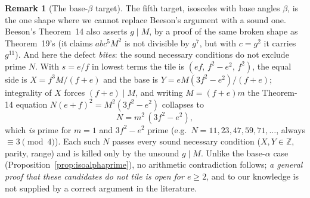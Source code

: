 \documentclass[11pt,reqno]{amsart}
\theoremstyle{plain}
\theoremstyle{definition}
\newtheorem{remark}[theorem]{Remark}
\newcommand{\Z}{\mathbb{Z}}
\begin{document}
\begin{remark}[The base-$\beta$ target]\label{rem:isobeta}
The fifth target, isosceles with base angles $\beta$, is the one shape where we cannot replace
Beeson's argument with a sound one. Beeson's Theorem~14 also asserts $g\mid M$, by a proof of the
same broken shape as Theorem~19's (it claims $abc^5M^2$ is not divisible by $g^7$, but with $c=g^2$
it carries $g^{11}$). And here the defect \emph{bites}: the sound necessary conditions do not exclude
prime $N$. With $s=e/f$ in lowest terms the tile is $(ef,\,f^2-e^2,\,f^2)$, the equal side is
$X=f^3M/(f+e)$ and the base is $Y=eM(3f^2-e^2)/(f+e)$; integrality of $X$ forces $(f+e)\mid M$, and
writing $M=(f+e)m$ the Theorem-14 equation $N(e+f)^2=M^2(3f^2-e^2)$ collapses to
\[
N=m^2\,(3f^2-e^2),
\]
which \emph{is} prime for $m=1$ and $3f^2-e^2$ prime (e.g.\ $N=11,23,47,59,71,\dots$, always
$\equiv3\pmod4$). Each such $N$ passes every sound necessary condition ($X,Y\in\Z$, parity, range)
and is killed only by the unsound $g\mid M$. Unlike the base-$\alpha$ case
(Proposition~\ref{prop:isoalphaprime}), no arithmetic contradiction follows; \emph{a general proof
that these candidates do not tile is open for $e\ge 2$}, and to our knowledge is not supplied by a
correct argument in the literature.


\end{remark}
\end{document}
